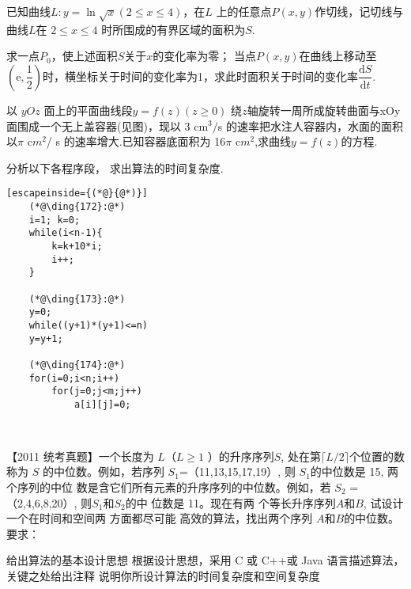 \begin{questions}[tr]
    
    \begin{bbox}
        \question  已知曲线$L:y=\ln\sqrt{x}(2\leqslant x\leqslant4)$，在$L$ 上的任意点$P(x,y)$作切线，记切线与曲线$L$在 $2\leqslant x\leqslant4$
        时所围成的有界区域的面积为$S$.
        \begin{subquestions}
            \subquestion 求一点$P_0$，使上述面积$S$关于$x$的变化率为零；
            \subquestion 当点$P(x,y)$在曲线上移动至$(\mathrm{e},\dfrac{1}{2})$时，横坐标关于时间的变化率为1，求此时面积关于时间的变化率$\dfrac{\mathrm{d}S}{\mathrm{d}t}.$
        \end{subquestions}

    \end{bbox}

    \begin{bbox}
        \question 以 $yOz$ 面上的平面曲线段$y=f(z)(z\geqslant0)$ 绕$z$轴旋转一周所成旋转曲面与xOy 面围成一个无上盖容器(见图)，现以 3 cm$^3/$s 的速率把水注人容器内，水面的面积以$\pi$ c$m^2$/ s 的速率增大.已知容器底面积为 16$\pi$ c$m^2$,求曲线$y=f(z)$的方程.

    \end{bbox}

    \begin{bbox}
        \question   分析以下各程序段， 求出算法的时间复杂度.
        \begin{lstlisting}[escapeinside={(*@}{@*)}]
    (*@\ding{172}:@*)
    i=1; k=0;
    while(i<n-1){
        k=k+10*i;
        i++;
    }

    (*@\ding{173}:@*)
    y=0;
    while((y+1)*(y+1)<=n)
    y=y+1;

    (*@\ding{174}:@*)
    for(i=0;i<n;i++)
        for(j=0;j<m;j++)
            a[i][j]=0;
    
        
        \end{lstlisting}
    \end{bbox}

    \begin{bbox}
        \question   【2011 统考真题】一个长度为 $L$（$L\geqslant 1$ ）的升序序列$ S$, 处在第$\lceil L/2\rceil $个位置的数称为 $S$
        的中位数。例如，若序列 $S_1$=（11,13,15,17,19）, 则 $S_1$的中位数是 15, 两 个序列的中位
        数是含它们所有元素的升序序列的中位数。例如，若 $S_2$ =（2,4,6,8,20）, 则$S_1$和$S_2$的中
        位数是 11。现在有两 个等长升序序列$A$和$B$, 试设计一个在时间和空间两 方面都尽可能
        高效的算法，找出两个序列 $A$和$B$的中位数。要求：
        \begin{subquestions}
            \subquestion 给出算法的基本设计思想
            \subquestion  根据设计思想，采用 C 或 C++或 Java 语言描述算法，关键之处给出注释
            \subquestion 说明你所设计算法的时间复杂度和空间复杂度
        \end{subquestions}
    \end{bbox}
\end{questions}

